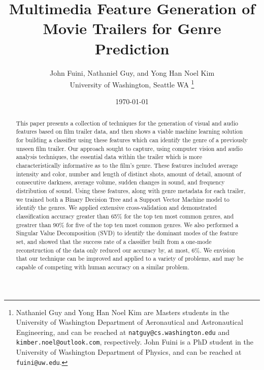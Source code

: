 \documentclass[letterpaper, 10 pt, conference]{ieeeconf}  %
\title{\LARGE \bf
Multimedia Feature Generation of Movie Trailers for Genre Prediction}
\author{John Fuini, Nathaniel Guy, and Yong Han Noel Kim\\
	University of Washington, Seattle WA%
\thanks{Nathaniel Guy and Yong Han Noel Kim are Masters students in the University of Washington Department of Aeronautical and Astronautical Engineering, and can be reached at {\tt\small natguy@cs.washington.edu} and {\tt\small kimber.noel@outlook.com}, respectively. John Fuini is a PhD student in the University of Washington Department of Physics, and can be reached at {\tt\small fuini@uw.edu}. }%
}
\date{ \today}
\begin{document}
\maketitle
\thispagestyle{empty}
\pagestyle{empty}

\begin{abstract}
This paper presents a collection of techniques for the generation of visual and audio features based on film trailer data, and then shows a viable machine learning solution for building a classifier using these features which can identify the genre of a previously unseen film trailer. Our approach sought to capture, using computer vision and audio analysis techniques, the essential data within the trailer which is more characteristically informative as to the film's genre. These features included average intensity and color, number and length of distinct shots, amount of detail, amount of consecutive darkness, average volume, sudden changes in sound, and frequency distribution of sound. Using these features, along with genre metadata for each trailer, we trained both a Binary Decision Tree and a Support Vector Machine model to identify the genres. We applied extensive cross-validation and demonstrated classification accuracy greater than 65\% for the top ten most common genres, and greatrer than 90\% for five of the top ten most common genres. We also performed a Singular Value Decomposition (SVD) to identify the dominant modes of the feature set, and showed that the success rate of a classifier built from a one-mode reconstruction of the data only reduced our accuracy by, at most, 6\%. We envision that our technique can be improved and applied to a variety of problems, and may be capable of competing with human accuracy on a similar problem.
\end{abstract}

\end{document}
